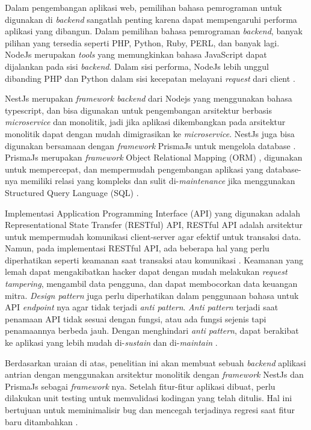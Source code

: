Dalam pengembangan aplikasi web, pemilihan bahasa pemrograman untuk digunakan di \textit{backend} sangatlah penting karena dapat mempengaruhi performa aplikasi yang dibangun. Dalam pemilihan bahasa pemrograman \textit{backend}, banyak pilihan yang tersedia seperti PHP, Python, Ruby, PERL, dan banyak lagi. NodeJs merupakan \textit{tools} yang memungkinkan bahasa JavaScript dapat dijalankan pada sisi \textit{backend}. Dalam sisi performa, NodeJs lebih unggul dibanding PHP dan Python dalam sisi kecepatan melayani \textit{request} dari client \cite{William2020} \cite{Odeniran2023}.

NestJs merupakan \textit{framework backend} dari Nodejs yang menggunakan bahasa typescript, dan bisa digunakan untuk pengembangan arsitektur berbasis \textit{microservice} dan monolitik, jadi jika aplikasi dikembangkan pada arsitektur monolitik dapat dengan mudah dimigrasikan ke \textit{microservice}. NestJs juga bisa digunakan bersamaan dengan \textit{framework} PrismaJs untuk mengelola database \cite{NestJS}. PrismaJs merupakan \textit{framework} Object Relational Mapping (ORM) \cite{Prisma}, digunakan untuk mempercepat, dan mempermudah pengembangan aplikasi yang database-nya memiliki relasi yang kompleks dan sulit di-\textit{maintenance} jika menggunakan Structured Query Language (SQL) \cite{Zmaranda2020}.

Implementasi Application Programming Interface (API) yang digunakan adalah Representational State Transfer (RESTful) API, RESTful API adalah arsitektur untuk mempermudah komunikasi client-server agar efektif untuk transaksi data. Namun, pada implementasi RESTful API, ada beberapa hal yang perlu diperhatikan seperti keamanan saat transaksi  atau komunikasi \cite{Beer2018}. Keamanan yang lemah dapat mengakibatkan hacker dapat dengan mudah melakukan \textit{request tampering}, mengambil data pengguna, dan dapat membocorkan data keuangan mitra. \textit{Design pattern} juga perlu diperhatikan dalam penggunaan bahasa untuk API \textit{endpoint} nya agar tidak terjadi \textit{anti pattern}. \textit{Anti pattern} terjadi saat penamaan API tidak sesuai dengan fungsi, atau ada fungsi sejenis tapi penamaannya berbeda jauh. Dengan menghindari \textit{anti pattern}, dapat berakibat ke aplikasi yang lebih mudah di-\textit{sustain} dan di-\textit{maintain} \cite{Aghajani2018} \cite{Alshraiedeh2021}.

Berdasarkan uraian di atas, penelitian ini akan membuat sebuah \textit{backend} aplikasi antrian dengan menggunakan arsitektur monolitik dengan \textit{framework} NestJs dan PrismaJs sebagai \textit{framework} nya. Setelah fitur-fitur aplikasi dibuat, perlu dilakukan unit testing untuk memvalidasi kodingan yang telah ditulis. Hal ini bertujuan untuk meminimalisir bug dan mencegah terjadinya regresi saat fitur baru ditambahkan \cite{runeson2006survey}.

